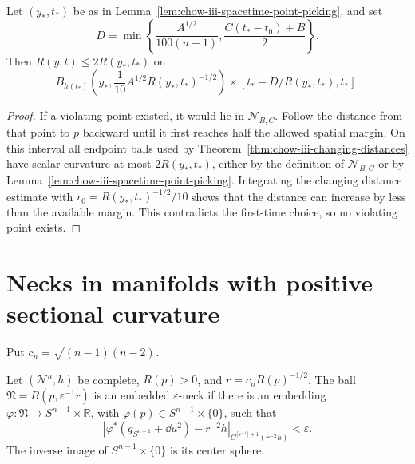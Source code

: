\begin{proposition}
\label{prop:chow-iii-parabolic-cylinder-curvature-control}


Let \((y_*,t_*)\) be as in
Lemma~\ref{lem:chow-iii-spacetime-point-picking}, and set
\[
 D=\min\left\{\frac{A^{1/2}}{100(n-1)},
 \frac{C(t_*-t_0)+B}{2}\right\}.
\]
Then \(R(y,t)\le2R(y_*,t_*)\) on
\[
 B_{h(t_*)}\left(y_*,\frac1{10}A^{1/2}R(y_*,t_*)^{-1/2}\right)
 \times[t_*-D/R(y_*,t_*),t_*].
\]
\end{proposition}
\begin{proof}
\sketch If a violating point existed, it would lie in \(\mathcal N_{B,C}\).  Follow
the distance from that point to \(p\) backward until it first reaches half the
allowed spatial margin.  On this interval all endpoint balls used by
Theorem~\ref{thm:chow-iii-changing-distances} have scalar curvature at most
\(2R(y_*,t_*)\), either by the definition of \(\mathcal N_{B,C}\) or by
Lemma~\ref{lem:chow-iii-spacetime-point-picking}.  Integrating the changing
distance estimate with \(r_0=R(y_*,t_*)^{-1/2}/10\) shows that the distance can
increase by less than the available margin.  This contradicts the first-time
choice, so no violating point exists.
\end{proof}

\section{Necks in manifolds with positive sectional curvature}

Put \(c_n=\sqrt{(n-1)(n-2)}\).

\begin{definition}
\label{def:chow-iii-embedded-epsilon-neck}

Let \((\mathcal N^n,h)\) be complete, \(R(p)>0\), and
\(r=c_nR(p)^{-1/2}\).  The ball \(\mathfrak N=B(p,\varepsilon^{-1}r)\) is an
embedded \(\varepsilon\)-neck if there is an embedding
\(\varphi:\mathfrak N\to S^{n-1}\times\mathbb R\), with
\(\varphi(p)\in S^{n-1}\times\{0\}\), such that
\[
 \left|\varphi^*(g_{S^{n-1}}+\dd u^2)-r^{-2}h\right|_
 {C^{\lceil\varepsilon^{-1}\rceil+1}(r^{-2}h)}<\varepsilon.
\]
The inverse image of \(S^{n-1}\times\{0\}\) is its center sphere.
\end{definition}

